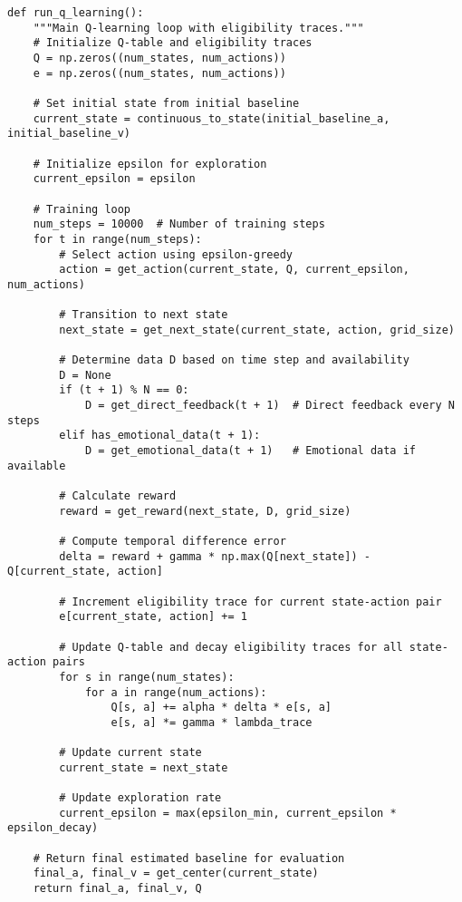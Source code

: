 \begin{lstlisting}[caption={Q-Learning with Eligibility Traces},label={lst:q-learning}]
def run_q_learning():
    """Main Q-learning loop with eligibility traces."""
    # Initialize Q-table and eligibility traces
    Q = np.zeros((num_states, num_actions))
    e = np.zeros((num_states, num_actions))
    
    # Set initial state from initial baseline
    current_state = continuous_to_state(initial_baseline_a, initial_baseline_v)
    
    # Initialize epsilon for exploration
    current_epsilon = epsilon
    
    # Training loop
    num_steps = 10000  # Number of training steps
    for t in range(num_steps):
        # Select action using epsilon-greedy
        action = get_action(current_state, Q, current_epsilon, num_actions)
        
        # Transition to next state
        next_state = get_next_state(current_state, action, grid_size)
        
        # Determine data D based on time step and availability
        D = None
        if (t + 1) % N == 0:
            D = get_direct_feedback(t + 1)  # Direct feedback every N steps
        elif has_emotional_data(t + 1):
            D = get_emotional_data(t + 1)   # Emotional data if available
        
        # Calculate reward
        reward = get_reward(next_state, D, grid_size)
        
        # Compute temporal difference error
        delta = reward + gamma * np.max(Q[next_state]) - Q[current_state, action]
        
        # Increment eligibility trace for current state-action pair
        e[current_state, action] += 1
        
        # Update Q-table and decay eligibility traces for all state-action pairs
        for s in range(num_states):
            for a in range(num_actions):
                Q[s, a] += alpha * delta * e[s, a]
                e[s, a] *= gamma * lambda_trace
        
        # Update current state
        current_state = next_state
        
        # Update exploration rate
        current_epsilon = max(epsilon_min, current_epsilon * epsilon_decay)
    
    # Return final estimated baseline for evaluation
    final_a, final_v = get_center(current_state)
    return final_a, final_v, Q
\end{lstlisting}